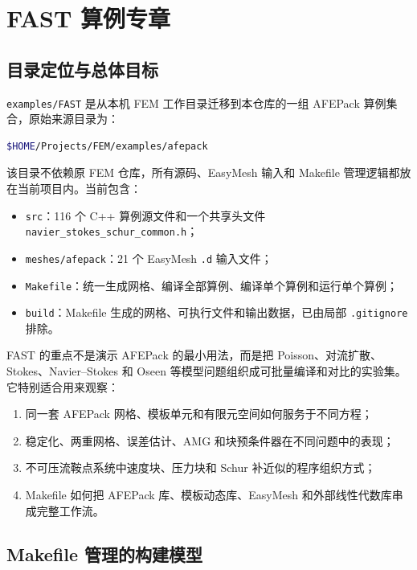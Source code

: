 \documentclass[UTF8,openany,zihao=-4,scheme=chinese]{ctexbook}
\newcommand{\file}[1]{\nolinkurl{#1}}
\begin{document}
\chapter{FAST 算例专章}

\section{目录定位与总体目标}

\file{examples/FAST} 是从本机 FEM 工作目录迁移到本仓库的一组 AFEPack 算例集合，原始来源目录为：

\begin{lstlisting}[language=bash]
$HOME/Projects/FEM/examples/afepack
\end{lstlisting}

该目录不依赖原 FEM 仓库，所有源码、EasyMesh 输入和 Makefile 管理逻辑都放在当前项目内。当前包含：

\begin{itemize}[leftmargin=2em]
  \item \file{src}：116 个 C++ 算例源文件和一个共享头文件 \file{navier\_stokes\_schur\_common.h}；
  \item \file{meshes/afepack}：21 个 EasyMesh \file{.d} 输入文件；
  \item \file{Makefile}：统一生成网格、编译全部算例、编译单个算例和运行单个算例；
  \item \file{build}：Makefile 生成的网格、可执行文件和输出数据，已由局部 \file{.gitignore} 排除。
\end{itemize}

FAST 的重点不是演示 AFEPack 的最小用法，而是把 Poisson、对流扩散、Stokes、Navier--Stokes 和 Oseen 等模型问题组织成可批量编译和对比的实验集。它特别适合用来观察：

\begin{enumerate}[leftmargin=2em]
  \item 同一套 AFEPack 网格、模板单元和有限元空间如何服务于不同方程；
  \item 稳定化、两重网格、误差估计、AMG 和块预条件器在不同问题中的表现；
  \item 不可压流鞍点系统中速度块、压力块和 Schur 补近似的程序组织方式；
  \item Makefile 如何把 AFEPack 库、模板动态库、EasyMesh 和外部线性代数库串成完整工作流。
\end{enumerate}

\section{Makefile 管理的构建模型}
\end{document}
